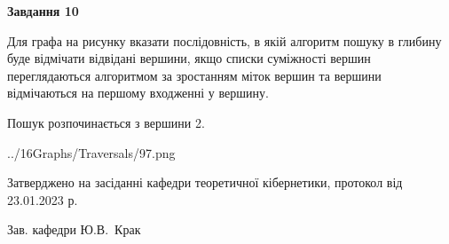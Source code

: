 \documentclass[12pt, ukrainian]{article}
\begin{document}
{\begin {large}
{\begin {center}\textbf{Завдання 10}\end {center}}\par
Для графа на рисунку вказати послідовність, в якій алгоритм пошуку в глибину буде відмічати відвідані вершини, якщо списки суміжності вершин переглядаються алгоритмом за зростанням міток вершин та вершини відмічаються на першому вход\-женні у вершину.\par
Пошук розпочинається з вершини 2.\par

\begin{center}
	{../16Graphs/Traversals/97.png}
\end{center}\par
\newpage


\end {large}
}
{\smallskip \begin {small} Затверджено на засіданні кафедри теоретичної кібернетики, протокол  від   23.01.2023 р.\par\smallskip\smallskip
{\parbox {6.5 cm}{Зав. кафедри \dotfill Ю.В.~Крак}} \end{small}}
\end{document}
